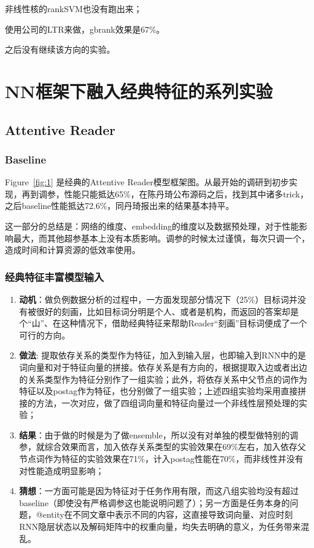 \documentclass[11pt]{article}
\begin{document}
\noindent 非线性核的rankSVM也没有跑出来；

\noindent 使用公司的LTR来做，gbrank效果是67\%。

\noindent 之后没有继续该方向的实验。


\section{NN框架下融入经典特征的系列实验}
\subsection{Attentive Reader}
\subsubsection{Baseline}
Figure~\ref{fig:1} 是经典的Attentive Reader模型框架图。从最开始的调研到初步实现，再到调参，性能只能抵达65\%，在陈丹琦公布源码之后，找到其中诸多trick，之后baseline性能抵达72.6\%，同丹琦报出来的结果基本持平。

这一部分的总结是：网络的维度、embedding的维度以及数据预处理，对于性能影响最大，而其他超参基本上没有本质影响。调参的时候太过谨慎，每次只调一个，造成时间和计算资源的低效率使用。
\subsubsection{经典特征丰富模型输入}
\begin{enumerate}
    \item {\bf 动机}：做负例数据分析的过程中，一方面发现部分情况下（25\%）目标词并没有被很好的刻画，比如目标词分明是个人、或者是机构，而返回的答案却是个“山”、在这种情况下，借助经典特征来帮助Reader“刻画”目标词便成了一个可行的方向。
    \item  {\bf 做法}: 提取依存关系的类型作为特征，加入到输入层，也即输入到RNN中的是词向量和对于特征向量的拼接。依存关系是有方向的，根据提取入边或者出边的关系类型作为特征分别作了一组实验；此外，将依存关系中父节点的词作为特征以及postag作为特征，也分别做了一组实验；上述四组实验均采用直接拼接的方法，一次对应，做了四组词向量和特征向量过一个非线性层预处理的实验；
    \item  {\bf  结果}：由于做的时候是为了做ensemble，所以没有对单独的模型做特别的调参，就综合效果而言，加入依存关系类型的实验效果在69\%左右，加入依存父节点词作为特征的实验效果在71\%，计入postag性能在70\%，而非线性并没有对性能造成明显影响；
    \item  {\bf  猜想}：一方面可能是因为特征对于任务作用有限，而这八组实验均没有超过baseline（即使没有严格调参这也能说明问题了）；另一方面是任务本身的问题，@entity在不同文章中表示不同的内容，这直接导致词向量、对应时刻RNN隐层状态以及解码矩阵中的权重向量，均失去明确的意义，为任务带来混乱。
\end{enumerate}
\end{document}
